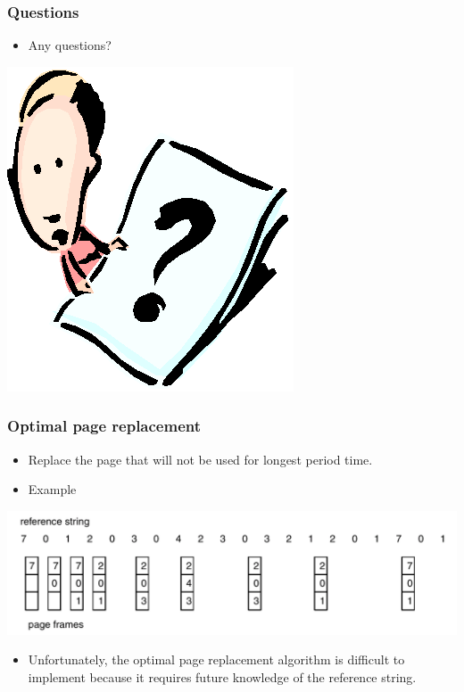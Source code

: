 \documentclass[CJKutf8,xcolor=pdftex,dvipsnames,table]{beamer}
\begin{document}
\begin{CJK*}{UTF8}{song}
  \begin{frame}
    \frametitle{Questions}
    \begin{itemize}
    \item{Any questions?}
    \end{itemize}
    \begin{center}
      \includegraphics[scale=.5]{question}
    \end{center}
  \end{frame}
  
  \begin{frame}
    \frametitle{Optimal page replacement} \pause
    \begin{itemize}
    \item{Replace the page that will not be used for longest period time.} \pause
    \item{Example} \pause
    \end{itemize}
    \begin{center}
      \includegraphics[scale=0.4]{v6f10-11} \pause
    \end{center}
    \begin{itemize}
    \item{Unfortunately, the optimal page replacement algorithm is difficult to implement because it requires future knowledge of the reference string.}
    \end{itemize}
  \end{frame}
  

\end{CJK*}
\end{document}
